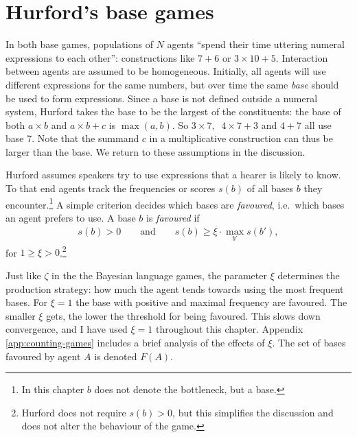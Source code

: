 \documentclass{../src/bcthesispart}
\begin{document}
\section{Hurford’s base games}


In both base games, populations of $N$ agents “spend their time uttering numeral expressions to each other”: constructions like $7+6$ or $3\times 10 + 5$.
Interaction between agents are assumed to be homogeneous.
Initially, all agents will use different expressions for the same numbers, but over time the same \emph{base} should be used to form expressions.
Since a base is not defined outside a numeral system, Hurford takes the base to be the largest of the constituents: the base of both $a\times b$ and $a\times b+c$ is $\max(a,b)$.
So $3\times 7, \;\; 4 \times 7 + 3$ and $4+7$ all use base 7. 
Note that the summand $c$ in a multiplicative construction can thus be larger than the base.
We return to these assumptions in the discussion.




Hurford assumes speakers try to use expressions that a hearer is likely to know.
To that end agents track the frequencies or scores $s(b)$ of all bases $b$ they encounter.\footnote{%
	In this chapter $b$ does not denote the bottleneck, but a base.
	}
A simple criterion decides which bases are \emph{favoured}, i.e.\ which bases an agent prefers to use.
A base $b$ is \emph{favoured} if 
\begin{align}
	\label{eq:favoured-base-criterion}
	s(b) > 0 
	\qquad \text{and} \qquad 
	s(b) \ge \xi \cdot \max_{b'} s(b'),
\end{align}
for $1 \ge \xi > 0$.\footnote{%
	Hurford does not require $s(b)>0$, but this simplifies the discussion and does not alter the behaviour of the game.
	}





Just like $\zeta$ in the the Bayesian language games, the parameter $\xi$ determines the production strategy: how much the agent tends towards using the most frequent bases.
For $\xi=1$ the base with positive and maximal frequency are favoured.
The smaller $\xi$ gets, the lower the threshold for being favoured.
This slows down convergence, and I have used $\xi=1$ throughout this chapter. 
Appendix \ref{app:counting-games} includes a brief analysis of the effects of $\xi$.
The set of bases favoured by agent $A$ is denoted $F(A)$.
\end{document}
